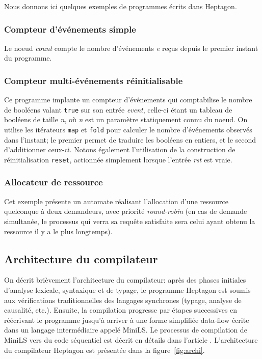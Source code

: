 \documentclass[a4paper]{article}
\newcommand{\LANG}{{\sc Heptagon}}
\newcommand{\minils}{{\sc MiniLS}}
\begin{document}
Nous donnons ici quelques exemples de programmes écrits dans \LANG.

\subsubsection{Compteur d'événements simple}



Le noeud \textit{count} compte le nombre d'événements \textit{e} re\c{c}us
depuis le premier instant du programme.

\subsubsection{Compteur multi-événements réinitialisable}



Ce programme implante un compteur d'événements qui comptabilise le
nombre de booléens valant \texttt{true} sur son entrée
\textit{event}, celle-ci étant un tableau de booléens de taille
\textit{n}, où \textit{n} est un paramètre statiquement connu du
noeud. On utilise les itérateurs \texttt{map} et \texttt{fold} pour
calculer le nombre d'événements observés dans l'instant; le
premier permet de traduire les booléens en entiers, et le second
d'additionner ceux-ci. Notons également l'utilisation de la
construction de réinitialisation \texttt{reset}, actionnée
simplement lorsque l'entrée \textit{rst} est vraie.

\subsubsection{Allocateur de ressource}



Cet exemple présente un automate réalisant l'allocation d'une ressource
quelconque à deux demandeurs, avec priorité \textit{round-robin} (en cas de
demande simultanée, le processus qui verra sa requête satisfaite sera celui
ayant obtenu la ressource il y a le plus longtemps).

\subsection{Architecture du compilateur}

On décrit brièvement l'architecture du compilateur: après des
phases initiales d'analyse lexicale, syntaxique et de typage, le
programme \LANG{} est soumis aux vérifications traditionnelles des
langages synchrones (typage, analyse de causalité, etc.). Ensuite, la compilation
progresse par étapes successives en réécrivant le programme jusqu'à
arriver à une forme simplifiée data-flow écrite dans un langage intermédiaire
appelé \minils. Le processus de compilation de \minils{}
vers du code séquentiel est décrit en détails dans
l'article \cite{lucy:lctes08a}. L'architecture du compilateur \LANG{} est présentée
dans la figure~\ref{fig:archi}.
\end{document}
